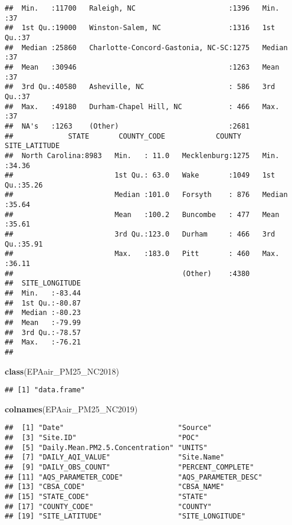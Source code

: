 \documentclass[]{article}
\newenvironment{Shaded}{\begin{snugshade}}{\end{snugshade}}
\newcommand{\KeywordTok}[1]{\textcolor[rgb]{0.13,0.29,0.53}{\textbf{#1}}}
\newcommand{\NormalTok}[1]{#1}
\begin{document}
\begin{verbatim}
##  Min.   :11700   Raleigh, NC                      :1396   Min.   :37  
##  1st Qu.:19000   Winston-Salem, NC                :1316   1st Qu.:37  
##  Median :25860   Charlotte-Concord-Gastonia, NC-SC:1275   Median :37  
##  Mean   :30946                                    :1263   Mean   :37  
##  3rd Qu.:40580   Asheville, NC                    : 586   3rd Qu.:37  
##  Max.   :49180   Durham-Chapel Hill, NC           : 466   Max.   :37  
##  NA's   :1263    (Other)                          :2681               
##             STATE       COUNTY_CODE            COUNTY     SITE_LATITUDE  
##  North Carolina:8983   Min.   : 11.0   Mecklenburg:1275   Min.   :34.36  
##                        1st Qu.: 63.0   Wake       :1049   1st Qu.:35.26  
##                        Median :101.0   Forsyth    : 876   Median :35.64  
##                        Mean   :100.2   Buncombe   : 477   Mean   :35.61  
##                        3rd Qu.:123.0   Durham     : 466   3rd Qu.:35.91  
##                        Max.   :183.0   Pitt       : 460   Max.   :36.11  
##                                        (Other)    :4380                  
##  SITE_LONGITUDE  
##  Min.   :-83.44  
##  1st Qu.:-80.87  
##  Median :-80.23  
##  Mean   :-79.99  
##  3rd Qu.:-78.57  
##  Max.   :-76.21  
## 
\end{verbatim}

\begin{Shaded}
\begin{Highlighting}[]
\KeywordTok{class}\NormalTok{(EPAair_PM25_NC2018)}
\end{Highlighting}
\end{Shaded}

\begin{verbatim}
## [1] "data.frame"
\end{verbatim}

\begin{Shaded}
\begin{Highlighting}[]
\KeywordTok{colnames}\NormalTok{(EPAair_PM25_NC2019)}
\end{Highlighting}
\end{Shaded}

\begin{verbatim}
##  [1] "Date"                           "Source"                        
##  [3] "Site.ID"                        "POC"                           
##  [5] "Daily.Mean.PM2.5.Concentration" "UNITS"                         
##  [7] "DAILY_AQI_VALUE"                "Site.Name"                     
##  [9] "DAILY_OBS_COUNT"                "PERCENT_COMPLETE"              
## [11] "AQS_PARAMETER_CODE"             "AQS_PARAMETER_DESC"            
## [13] "CBSA_CODE"                      "CBSA_NAME"                     
## [15] "STATE_CODE"                     "STATE"                         
## [17] "COUNTY_CODE"                    "COUNTY"                        
## [19] "SITE_LATITUDE"                  "SITE_LONGITUDE"
\end{verbatim}
\end{document}

